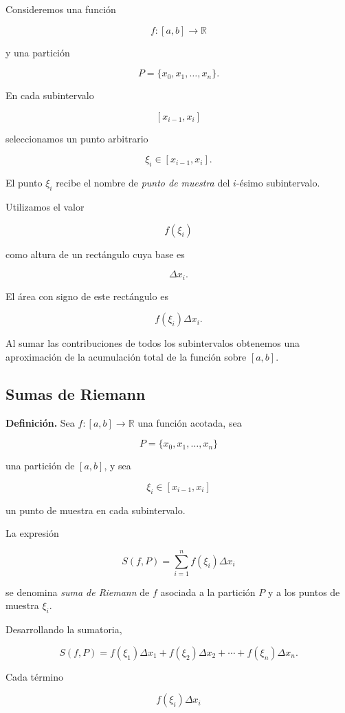 \documentclass[12pt]{article}
\begin{document}
Consideremos una función

\[
f:[a,b]\longrightarrow\mathbb{R}
\]

y una partición

\[
P=\{x_0,x_1,\ldots,x_n\}.
\]

En cada subintervalo

\[
[x_{i-1},x_i]
\]

seleccionamos un punto arbitrario

\[
\xi_i\in[x_{i-1},x_i].
\]

El punto $\xi_i$ recibe el nombre de \emph{punto de muestra} del
$i$-ésimo subintervalo.

Utilizamos el valor

\[
f(\xi_i)
\]

como altura de un rectángulo cuya base es

\[
\Delta x_i.
\]

El área con signo de este rectángulo es

\[
f(\xi_i)\Delta x_i.
\]

Al sumar las contribuciones de todos los subintervalos obtenemos una
aproximación de la acumulación total de la función sobre $[a,b]$.

\subsection{Sumas de Riemann}

\textbf{Definición.}
Sea $f:[a,b]\to\mathbb{R}$ una función acotada, sea

\[
P=\{x_0,x_1,\ldots,x_n\}
\]

una partición de $[a,b]$, y sea

\[
\xi_i\in[x_{i-1},x_i]
\]

un punto de muestra en cada subintervalo.

La expresión

\[
\boxed{
S(f,P)
=
\sum_{i=1}^{n}
f(\xi_i)\Delta x_i
}
\]

se denomina \emph{suma de Riemann} de $f$ asociada a la partición $P$
y a los puntos de muestra $\xi_i$.

Desarrollando la sumatoria,

\[
S(f,P)
=
f(\xi_1)\Delta x_1
+
f(\xi_2)\Delta x_2
+
\cdots
+
f(\xi_n)\Delta x_n.
\]

Cada término

\[
f(\xi_i)\Delta x_i
\]
\end{document}
